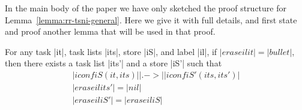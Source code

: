 In the main body of the paper we have only sketched the proof structure
for Lemma~\ref{lemma:rr-tsni-general}.  Here we give it with full
details, and first state and proof another lemma that will be used in that
proof.


\begin{lemma}
  \label{lemma:high-not-blocking}
  For any task |it|, task lists |its|, store |iS|, and label |il|, if
  $|erase il it|=|bullet|$, then there exists a task list
  |its'| and a store |iS'| such that
  \begin{align}
  |iconf iS (it, its)| |.->| |iconf iS' (its, its')| \label{eq:hnb-1} \\
  |erase il its'|=|nil| \label{eq:hnb-2}\\
  |erase il iS'|=|erase il iS| \label{eq:hnb-3}
  \end{align}
\end{lemma}
